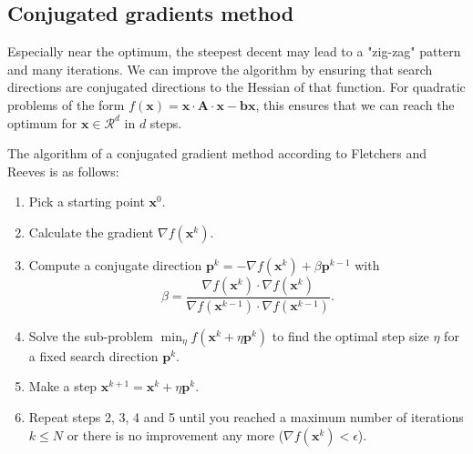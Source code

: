 \subsection{Conjugated gradients method}
Especially near the optimum, the steepest decent may lead to a "zig-zag" pattern and many iterations. We can improve the algorithm by ensuring that search directions are conjugated directions to the Hessian of that function. For quadratic problems of the form $f(\mathbf{x}) = \mathbf{x} \cdot \mathbf{A} \cdot \mathbf{x} - \mathbf{b} \mathbf{x}$, this ensures that we can reach the optimum for $\mathbf{x} \in \mathcal{R}^d$ in $d$ steps.

The algorithm of a conjugated gradient method according to Fletchers and Reeves \cite{Fletcher1964} is as follows: 
\begin{enumerate}
    \item Pick a starting point $\mathbf{x}^0$.
    \item Calculate the gradient $\nabla f(\mathbf{x}^k)$.
    \item Compute a conjugate direction $\mathbf{p}^k = -\nabla f(\mathbf{x}^k) + \beta \mathbf{p}^{k-1}$ with  
    \begin{equation}
        \beta = \frac{\nabla f(\mathbf{x}^k) \cdot \nabla f(\mathbf{x}^k)}{\nabla f(\mathbf{x}^{k-1}) \cdot \nabla f(\mathbf{x}^{k-1})}.
    \end{equation}
    \item Solve the sub-problem $\min_{\eta} f(\mathbf{x}^k + \eta \mathbf{p}^k)$ to find the optimal step size $\eta$ for a fixed search direction $\mathbf{p}^k$.
    \item Make a step $\mathbf{x}^{k+1} = \mathbf{x}^k + \eta \mathbf{p}^k$.
    \item Repeat steps 2, 3, 4 and 5 until you reached a maximum number of iterations $k \le N$ or there is no improvement any more ($ \nabla f(\mathbf{x}^k) < \epsilon$). 
\end{enumerate}

